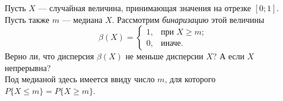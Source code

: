 \documentclass{article}
\begin{document}
Пусть $X$ --- случайная величина, принимающая значения на отрезке $[0;1]$.
Пусть также $m$ --- медиана $X$. Рассмотрим \textit{бинаризацию} этой величины
$$\beta (X) = \begin{cases}1,& \textrm{при }X \geqslant m;\\0,& \text{иначе.}\end{cases}$$
Верно ли, что дисперсия $\beta (X)$ не меньше дисперсии $X$? А если $X$ непрерывна?\\
Под медианой здесь имеется ввиду число $m$, для которого $P\{X \leqslant m\} = P\{X \geqslant m\}$.
\end{document}
